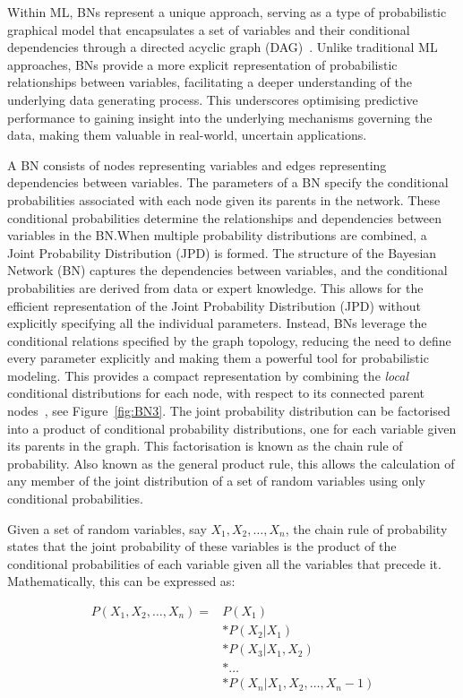 \documentclass[journal]{IEEEtran}
\begin{document}
Within ML, BNs represent a unique approach, serving as a type of probabilistic graphical model that encapsulates a set of variables and their conditional dependencies through a directed acyclic graph (DAG)~\cite{Hand2001}. Unlike traditional ML approaches, BNs provide a more explicit representation of probabilistic relationships between variables, facilitating a deeper understanding of the underlying data generating process. This underscores optimising predictive performance to gaining insight into the underlying mechanisms governing the data, making them valuable in real-world, uncertain applications. 

A BN consists of nodes representing variables and edges representing dependencies between variables. The parameters of a BN specify the conditional probabilities associated with each node given its parents in the network. These conditional probabilities determine the relationships and dependencies between variables in the BN.\@ When multiple probability distributions are combined, a Joint Probability Distribution (JPD) is formed. The structure of the Bayesian Network (BN) captures the dependencies between variables, and the conditional probabilities are derived from data or expert knowledge. This allows for the efficient representation of the Joint Probability Distribution (JPD) without explicitly specifying all the individual parameters. Instead, BNs leverage the conditional relations specified by the graph topology, reducing the need to define every parameter explicitly and making them a powerful tool for probabilistic modeling. This provides a compact representation by combining the \textit{local} conditional distributions for each node, with respect to its connected parent nodes~\cite{Koller2009}, see Figure~\ref{fig:BN3}. The joint probability distribution can be factorised into a product of conditional probability distributions, one for each variable given its parents in the graph. This factorisation is known as the chain rule of probability. Also known as the general product rule, this allows the calculation of any member of the joint distribution of a set of random variables using only conditional probabilities.

Given a set of random variables, say $X_1, X_2, \ldots, X_n$, the chain rule of probability states that the joint probability of these variables is the product of the conditional probabilities of each variable given all the variables that precede it. Mathematically, this can be expressed as:

\begin{align}
    P(X_1, X_2, \ldots, X_n) = & P(X_1) \nonumber \\
    & * P(X_2 | X_1) \nonumber \\
    & * P(X_3 | X_1, X_2) \nonumber \\
    & * \ldots \nonumber \\
    & * P(X_n | X_1, X_2, \ldots, X_n-1)
    \label{eq:chain_rule}
\end{align}
    
\end{document}
